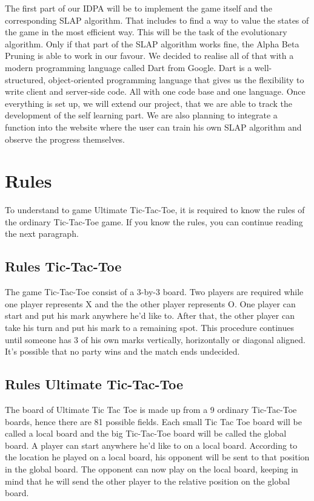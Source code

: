 The first part of our IDPA will be to implement the game itself and the corresponding SLAP algorithm. 
That includes to find a way to value the states of the game in the most efficient way. This will be the task of the evolutionary algorithm. Only if that part of the SLAP algorithm works fine, the Alpha Beta Pruning is able to work in our favour.
We decided to realise all of that with a modern programming language called Dart from Google. Dart is a well-structured, object-oriented programming language that gives us the flexibility to write client and server-side code. All with one code base and one language. Once everything is set up, we will extend our project, that we are able to track the development of the self learning part. We are also planning to integrate a function into the website where the user can train his own SLAP algorithm and observe the progress themselves.

\section{Rules}
To understand to game Ultimate Tic-Tac-Toe, it is required to  know the rules of the ordinary Tic-Tac-Toe game. If you know the rules, you can continue reading the next paragraph. 

\subsection {Rules Tic-Tac-Toe}
The game Tic-Tac-Toe consist of a 3-by-3 board. Two players are required while one player represents X and the the other player represents O. One player can start and put his mark anywhere he'd like to. After that, the other player can take his turn and put his mark to a remaining spot. This procedure continues until someone has 3 of his own marks vertically, horizontally or diagonal aligned. It's possible that no party wins and the match ends undecided.

\subsection {Rules Ultimate Tic-Tac-Toe}
The board of Ultimate Tic Tac Toe is made up from a 9 ordinary Tic-Tac-Toe boards, hence there are 81 possible fields.
Each small Tic Tac Toe board will be called a local board and the big Tic-Tac-Toe board will be called the global board.
A player can start anywhere he'd like to on a local board. According to the location he played on a local board, his opponent will be sent to that position in the global board. The opponent can now play on the local board, keeping in mind that he will send the other player to the relative position on the global board. 

